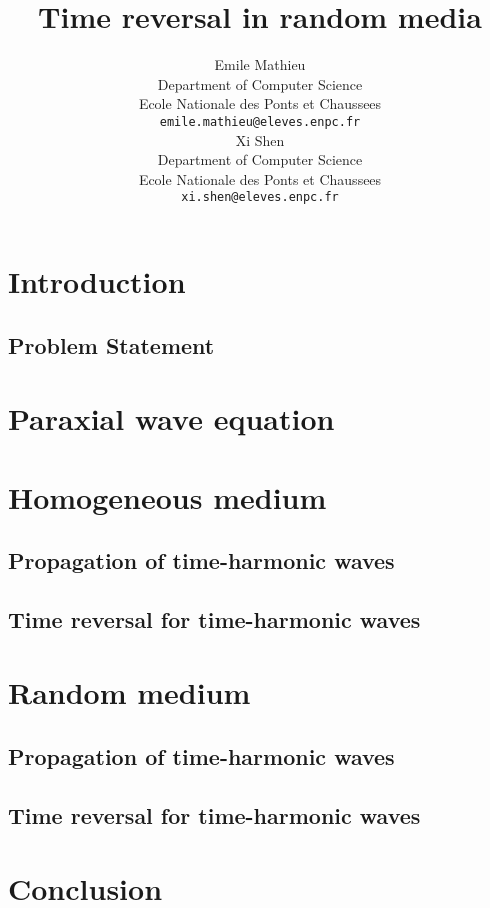 \documentclass{article} %
\title{Time reversal in random media}
\author{
Emile Mathieu\\ %
Department of Computer Science\\
Ecole Nationale des Ponts et  Chaussees \\
\texttt{emile.mathieu@eleves.enpc.fr} \\
\And
Xi Shen \\
Department of Computer Science\\
Ecole Nationale des Ponts et  Chaussees \\
\texttt{xi.shen@eleves.enpc.fr} \\
}
\begin{document}
\maketitle

\begin{abstract}

\end{abstract}

\section{Introduction}

\subsection{Problem Statement}

\section{Paraxial wave equation}

\section{Homogeneous medium}

\subsection{Propagation of time-harmonic waves}
\subsection{Time reversal for time-harmonic waves}


\section{Random medium}

\subsection{Propagation of time-harmonic waves}
\subsection{Time reversal for time-harmonic waves}

\section{Conclusion}

\nocite{*}


\end{document}
